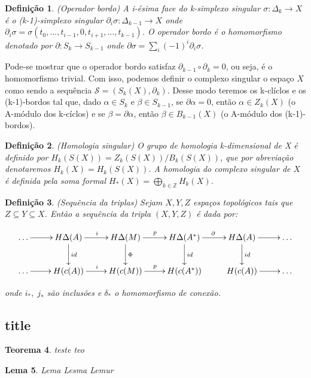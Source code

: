 \documentclass[twoside,openright,titlepage,numbers=noenddot,headinclude,  lineheaders footinclude=true,cleardoublepage=empty,
                                BCOR=5mm,paper=a4,fontsize=12pt ]{scrbook}
\newtheorem{teo}{Teorema}[chapter]
\newtheorem{lema}[teo]{Lema}
\newtheorem{defn}[teo]{Definição}
\begin{document}
\begin{defn}
	(Operador bordo) A i-ésima face do k-simplexo singular $\sigma: \Delta_{k} \to X$ é o (k-1)-simplexo singular $\partial_{i}\sigma:\Delta_{k-1} \to X$ onde $\partial_{i}\sigma = \sigma(t_{0}, \dots, t_{i-1},0,t_{i+1}, \dots, t_{k-1})$. O operador bordo é o homomorfismo denotado por $\partial : S_{k} \to S_{k-1}$ onde $\partial\sigma = \sum_{i} (-1)^{i}\partial_{i}\sigma$.
\end{defn}
Pode-se mostrar que o operador bordo satisfaz $\partial_{k-1}\circ\partial_{k} = 0$, ou seja, é o homomorfismo trivial. Com isso, podemos definir o complexo singular o espaço $X$ como sendo a sequência $\mathcal{S} = (S_{k}(X), \partial_{k})$. Desse modo teremos os k-clíclos e os (k-1)-bordos tal que, dado $\alpha \in S_{k}$ e $\beta \in S_{k-1}$, se $\partial\alpha = 0$, então $\alpha \in Z_{k}(X)$ (o A-módulo dos k-cíclos) e se $\beta = \partial\alpha$, então $\beta\in B_{k-1}(X)$ (o A-módulo dos (k-1)-bordos).

\begin{defn}
	(Homologia singular) O grupo de homologia k-dimensional de X é definido por $H_{k}(S(X)) = Z_{k}(S(X))/B_{k}(S(X))$, que por abreviação denotaremos $H_{k}(X)=H_{k}(S(X))$. A homologia do complexo singular de $X$ é definida pela soma formal $H_{*}(X) = \bigoplus_{k \in \mathbb{Z}}H_{k}(X)$.
\end{defn}

\begin{defn}
	(Sequência da triplas) Sejam $X, Y, Z$ espaços topológicos tais que $Z \subseteq Y \subseteq X$. Então a sequência da tripla $(X,Y,Z)$ é dada por:

$$\xymatrix{\ldots \ar[r] & H\Delta(A) \ar[r]^{i} \ar[d]^{id}& H\Delta(M) \ar[r]^{p} \ar[d]^{\Phi}&
	H\Delta(A^*)\ar[r]^{{\partial}}\ar[d]^{id} & H\Delta(A)\ar[d]^{id} \ar[r] & \ldots\\
	\ldots \ar[r] & H(c(A)) \ar[r]^{i} & H(c(M)) \ar[r]^{p} & H(c(A^*)) & H(c(A)) \ar[r] & \ldots }$$

	onde $i_{*},\;j_{*}$ são inclusões e $\delta_{*}$ o homomorfismo de conexão.
\end{defn}


\subsection{title}
\begin{teo}
 teste teo \blindtext 
\end{teo}
\begin{lema}
 Lema Lesma Lemur
\end{lema}
\end{document}
